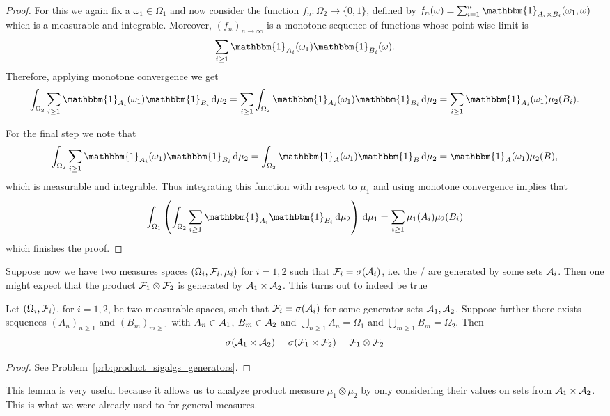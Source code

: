 \begin{proof}
For this we again fix a $\omega_1 \in \Omega_1$ and now consider the function $f_n : \Omega_2 \to \{0,1\}$, defined by $f_n(\omega) = \sum_{i = 1}^n \mathbbm{1}_{A_i \times B_i}(\omega_1, \omega)$ which is a measurable and integrable. Moreover, $(f_n)_{n \to \infty}$ is a monotone sequence of functions whose point-wise limit is 
\[
	\sum_{i \ge 1} \mathbbm{1}_{A_i}(\omega_1) \mathbbm{1}_{B_i}(\omega).
\]
Therefore, applying monotone convergence we get
\[
	\int_{\Omega_2} \sum_{i \ge 1} \mathbbm{1}_{A_i}(\omega_1) \mathbbm{1}_{B_i} \, \dd \mu_2 
	= \sum_{i \ge 1} \int_{\Omega_2} \mathbbm{1}_{A_i}(\omega_1) \mathbbm{1}_{B_i} \, \dd \mu_2 
	= \sum_{i \ge 1} \mathbbm{1}_{A_i}(\omega_1) \mu_2(B_i).
\]

For the final step we note that
\[
	\int_{\Omega_2} \sum_{i \ge 1} \mathbbm{1}_{A_i}(\omega_1) \mathbbm{1}_{B_i} \, \dd \mu_2 = 
	\int_{\Omega_2} \mathbbm{1}_A(\omega_1) \mathbbm{1}_B \, \dd \mu_2 = \mathbbm{1}_{A}(\omega_1)\mu_2(B),
\]
which is measurable and integrable. Thus integrating this function with respect to $\mu_1$ and using monotone convergence implies that
\[
	\int_{\Omega_1} \left(\int_{\Omega_2} \sum_{i \ge 1} \mathbbm{1}_{A_i} \mathbbm{1}_{B_i} \, \dd \mu_2\right) \, \dd \mu_1 = \sum_{i \ge 1} \mu_1(A_i) \mu_2(B_i)
\]
which finishes the proof.
\end{proof}


Suppose now we have two measures spaces $(\Omega_i, \mathcal F_i, \mu_i)$ for $i = 1,2$ such that $\mathcal F_i = \sigma(\mathcal A_i)$, i.e. the \sigalgs/ are generated by some sets $\mathcal A_i$. Then one might expect that the product $\mathcal F_1 \otimes \mathcal F_2$ is generated by $\mathcal A_1 \times \mathcal A_2$. This turns out to indeed be true

\begin{lemma}\label{lem:product_sigalgs_generators}
Let $(\Omega_i, \mathcal F_i)$, for $i = 1, 2$,  be two measurable spaces, such that $\mathcal F_i = \sigma(\mathcal A_i)$ for some generator sets $\mathcal A_1, \mathcal A_2$. Suppose further there exists sequences $(A_n)_{n \ge 1}$ and $(B_m)_{m \ge 1}$ with $A_n \in \mathcal A_1$, $B_m \in \mathcal A_2$ and $\bigcup_{n \ge 1} A_n = \Omega_1$ and $\bigcup_{m \ge 1} B_m = \Omega_2$. Then
\[
	\sigma(\mathcal A_1 \times \mathcal A_2) = \sigma(\mathcal F_1 \times \mathcal F_2) = \mathcal F_1 \otimes \mathcal F_2
\] 
\end{lemma}

\begin{proof}
See Problem~\ref{prb:product_sigalgs_generators}.
\end{proof}

This lemma is very useful because it allows us to analyze product measure $\mu_1 \otimes \mu_2$ by only considering their values on sets from $\mathcal A_1 \times \mathcal A_2$. This is what we were already used to for general measures.


